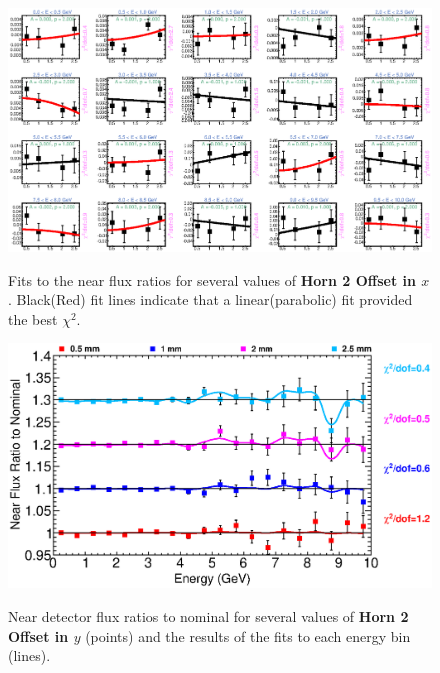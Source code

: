 {\begin{figure}[ht]
  \begin{center}
    {\includegraphics[width=5.0in]{figures/Horn2XOffset_near_fits.eps}}
  \end{center}
\caption{ Fits to the near flux ratios for several values of {\bf Horn 2 Offset in $x$}. Black(Red) fit lines indicate that a linear(parabolic) fit provided the best $\chi^2$. }
\end{figure}

\begin{figure}[ht]
  \begin{center}
    {\includegraphics[width=6.0in]{figures/Horn2YOffset_near_summary.eps}}
  \end{center}
\caption{ Near detector flux ratios to nominal for several values of {\bf Horn 2 Offset in $y$} (points) and the results of the fits to each energy bin (lines).}
\end{figure}

}

